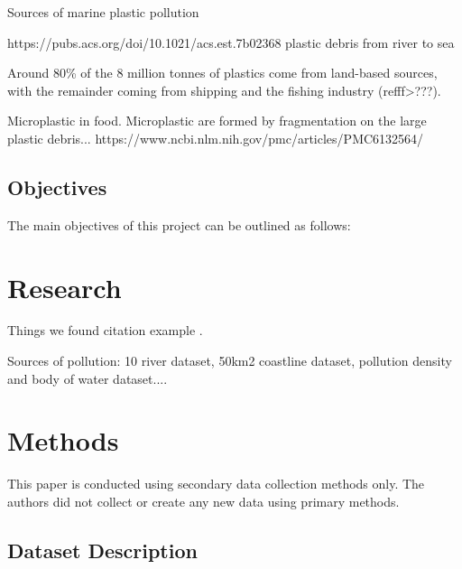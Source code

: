 \documentclass[10pt]{article}
\begin{document}
Sources of marine plastic pollution

https://pubs.acs.org/doi/10.1021/acs.est.7b02368 plastic debris from river to sea

Around 80\% of the 8 million tonnes of plastics come from land-based sources, with the remainder coming from shipping and the fishing industry (refff>???). 

Microplastic in food. Microplastic are formed by fragmentation on the large plastic debris...
https://www.ncbi.nlm.nih.gov/pmc/articles/PMC6132564/



\subsection{Objectives }\label{obj}

The main objectives of this project can be outlined as follows: 




\section{Research}\label{research}

Things we found
citation example \cite{8489087}.

Sources of pollution: 10 river dataset, 50km2 coastline dataset, pollution density and body of water dataset....


\section {Methods}\label{methods}

This paper is conducted using secondary data collection methods only. The authors did not collect or create any new data using primary methods.


\subsection{Dataset Description}\label{dataset}
\end{document}
